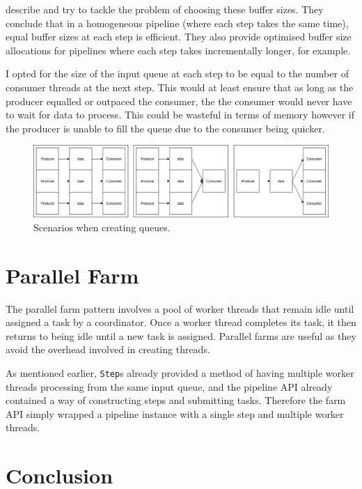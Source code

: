 \documentclass[12pt]{article}
\def\code#1{\texttt{#1}}
\begin{document}
\cite{buffer} describe and try to tackle the problem of choosing these buffer sizes. They conclude that in a homogeneous pipeline (where each step takes the same time), equal buffer sizes at each step is efficient. They also provide optimised buffer size allocations for pipelines where each step takes incrementally longer, for example. 

I opted for the size of the input queue at each step to be equal to the number of consumer threads at the next step. This would at least ensure that as long as the producer equalled or outpaced the consumer, the the consumer would never have to wait for data to process. This could be wasteful in terms of memory however if the producer is unable to fill the queue due to the consumer being quicker.

\begin{figure}[!ht]
	\centering 
	\includegraphics[width=\linewidth]{images/qsize}
	\caption{Scenarios when creating queues.}
	\label{fig:qsize}
\end{figure}

\section{Parallel Farm}

The parallel farm pattern involves a pool of worker threads that remain idle until assigned a task by a coordinator. Once a worker thread completes its task, it then returns to being idle until a new task is assigned. Parallel farms are useful as they avoid the overhead involved in creating threads. 

As mentioned earlier, \code{Step}s already provided a method of having multiple worker threads processing from the same input queue, and the pipeline API already contained a way of constructing steps and submitting tasks. Therefore the farm API simply wrapped a pipeline instance with a single step and multiple worker threads.

\section*{Conclusion}



\end{document}
